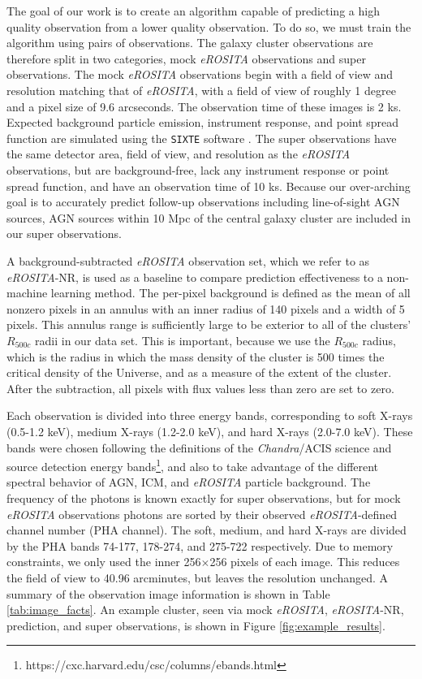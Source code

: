 \documentclass[twocolumn, 11pt]{aastex63}%
\begin{document}
The goal of our work is to create an algorithm capable of predicting a high quality observation from a lower quality observation. To do so, we must train the algorithm using pairs of observations. The galaxy cluster observations are therefore split in two categories, mock \textit{eROSITA} observations and super observations. The mock \textit{eROSITA} observations begin with a field of view and resolution matching that of \textit{eROSITA}, with a field of view of roughly 1 degree and a pixel size of 9.6 arcseconds. The observation time of these images is 2 ks. Expected background particle emission, instrument response, and point spread function are simulated using the \texttt{SIXTE} software \citep{SIXTE}. The super observations have the same detector area, field of view, and resolution as the \textit{eROSITA} observations, but are background-free, lack any instrument response or point spread function, and have an observation time of 10 ks. Because our over-arching goal is to accurately predict follow-up observations including line-of-sight AGN sources, AGN sources within 10 Mpc of the central galaxy cluster are included in our super observations. 

A background-subtracted \textit{eROSITA} observation set, which we refer to as \textit{eROSITA}-NR, is used as a baseline to compare prediction effectiveness to a non-machine learning method. The per-pixel background is defined as the mean of all nonzero pixels in an annulus with an inner radius of 140 pixels and a width of 5 pixels. This annulus range is sufficiently large to be exterior to all of the clusters' $R_{500c}$ radii in our data set. This is important, because we use the $R_{500c}$ radius, which is the radius in which the mass density of the cluster is 500 times the critical density of the Universe, and as a measure of the extent of the cluster. After the subtraction, all pixels with flux values less than zero are set to zero.

Each observation is divided into three energy bands, corresponding to soft X-rays (0.5-1.2 keV), medium X-rays (1.2-2.0 keV), and hard X-rays (2.0-7.0 keV). These bands were chosen following the definitions of the \textit{Chandra}/ACIS science and source detection energy bands\footnote{https://cxc.harvard.edu/csc/columns/ebands.html}, and also to take advantage of the different spectral behavior of AGN, ICM, and \textit{eROSITA} particle background. The frequency of the photons is known exactly for super observations, but for mock \textit{eROSITA} observations photons are sorted by their observed \textit{eROSITA}-defined channel number (PHA channel). The soft, medium, and hard X-rays are divided by the PHA bands 74-177, 178-274, and 275-722 respectively. Due to memory constraints, we only used the inner 256$\times$256 pixels of each image. This reduces the field of view to 40.96 arcminutes, but leaves the resolution unchanged. A summary of the observation image information is shown in Table \ref{tab:image_facts}. An example cluster, seen via mock \textit{eROSITA}, \textit{eROSITA}-NR, prediction, and super observations, is shown in Figure \ref{fig:example_results}.
\end{document}
